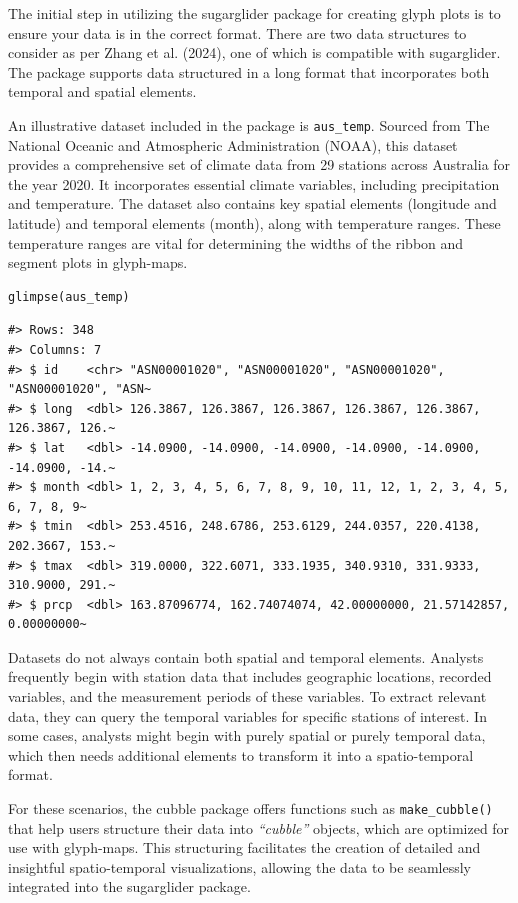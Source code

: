 The initial step in utilizing the sugarglider package for creating glyph plots is to ensure your data is in the correct format. There are two data structures to consider as per Zhang et al. (2024), one of which is compatible with sugarglider. The package supports data structured in a long format that incorporates both temporal and spatial elements.

An illustrative dataset included in the package is \texttt{aus\_temp}. Sourced from The National Oceanic and Atmospheric Administration (NOAA), this dataset provides a comprehensive set of climate data from 29 stations across Australia for the year 2020. It incorporates essential climate variables, including precipitation and temperature. The dataset also contains key spatial elements (longitude and latitude) and temporal elements (month), along with temperature ranges. These temperature ranges are vital for determining the widths of the ribbon and segment plots in glyph-maps.

\begin{verbatim}
glimpse(aus_temp)
\end{verbatim}

\begin{verbatim}
#> Rows: 348
#> Columns: 7
#> $ id    <chr> "ASN00001020", "ASN00001020", "ASN00001020", "ASN00001020", "ASN~
#> $ long  <dbl> 126.3867, 126.3867, 126.3867, 126.3867, 126.3867, 126.3867, 126.~
#> $ lat   <dbl> -14.0900, -14.0900, -14.0900, -14.0900, -14.0900, -14.0900, -14.~
#> $ month <dbl> 1, 2, 3, 4, 5, 6, 7, 8, 9, 10, 11, 12, 1, 2, 3, 4, 5, 6, 7, 8, 9~
#> $ tmin  <dbl> 253.4516, 248.6786, 253.6129, 244.0357, 220.4138, 202.3667, 153.~
#> $ tmax  <dbl> 319.0000, 322.6071, 333.1935, 340.9310, 331.9333, 310.9000, 291.~
#> $ prcp  <dbl> 163.87096774, 162.74074074, 42.00000000, 21.57142857, 0.00000000~
\end{verbatim}

Datasets do not always contain both spatial and temporal elements. Analysts frequently begin with station data that includes geographic locations, recorded variables, and the measurement periods of these variables. To extract relevant data, they can query the temporal variables for specific stations of interest. In some cases, analysts might begin with purely spatial or purely temporal data, which then needs additional elements to transform it into a spatio-temporal format.

For these scenarios, the cubble package offers functions such as \texttt{make\_cubble()} that help users structure their data into \emph{``cubble''} objects, which are optimized for use with glyph-maps. This structuring facilitates the creation of detailed and insightful spatio-temporal visualizations, allowing the data to be seamlessly integrated into the sugarglider package.

